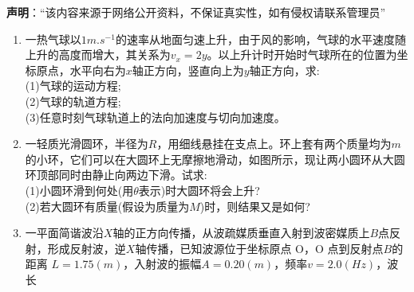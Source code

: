 

\textbf{声明}：“该内容来源于网络公开资料，不保证真实性，如有侵权请联系管理员”

\begin{enumerate}
\item 一热气球以$1m.s^{-1}$的速率从地面匀速上升，由于风的影响，气球的水平速度随上升的高度而增大，其关系为$v_x=2y$。以上升计时开始时气球所在的位置为坐标原点，水平向右为$x$轴正方向，竖直向上为$y$轴正方向，求:\\
(1)气球的运动方程;\\
(2)气球的轨道方程;\\
(3)任意时刻气球轨道上的法向加速度与切向加速度。
\item 一轻质光滑圆环，半径为$R$，用细线悬挂在支点上。环上套有两个质量均为$m$的小环，它们可以在大圆环上无摩擦地滑动，如图所示，现让两小圆环从大圆环顶部同时由静止向两边下滑。试求:\\
(1)小圆环滑到何处(用$\theta$表示)时大圆环将会上升?\\
(2)若大圆环有质量(假设为质量为$M$)时，则结果又是如何?
\item 一平面简谐波沿$X$轴的正方向传播，从波疏媒质垂直入射到波密媒质上$B$点反射，形成反射波，逆$X$轴传播，已知波源位于坐标原点 O，O 点到反射点$B$的距离 $L=1.75(m)$，入射波的振幅$A=0.20(m)$，频率$v=2.0(Hz)$，波长
\end{enumerate}